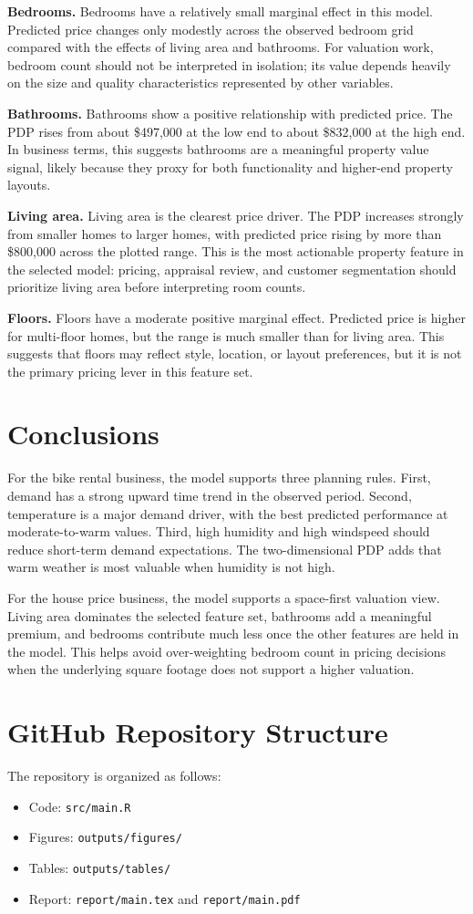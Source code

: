 \documentclass[11pt]{article}
\begin{document}
\textbf{Bedrooms.}
Bedrooms have a relatively small marginal effect in this model. Predicted price changes only modestly across the observed bedroom grid compared with the effects of living area and bathrooms. For valuation work, bedroom count should not be interpreted in isolation; its value depends heavily on the size and quality characteristics represented by other variables.

\textbf{Bathrooms.}
Bathrooms show a positive relationship with predicted price. The PDP rises from about \$497,000 at the low end to about \$832,000 at the high end. In business terms, this suggests bathrooms are a meaningful property value signal, likely because they proxy for both functionality and higher-end property layouts.

\textbf{Living area.}
Living area is the clearest price driver. The PDP increases strongly from smaller homes to larger homes, with predicted price rising by more than \$800,000 across the plotted range. This is the most actionable property feature in the selected model: pricing, appraisal review, and customer segmentation should prioritize living area before interpreting room counts.

\textbf{Floors.}
Floors have a moderate positive marginal effect. Predicted price is higher for multi-floor homes, but the range is much smaller than for living area. This suggests that floors may reflect style, location, or layout preferences, but it is not the primary pricing lever in this feature set.

\section{Conclusions}

For the bike rental business, the model supports three planning rules. First, demand has a strong upward time trend in the observed period. Second,  temperature is a major demand driver, with the best predicted performance at moderate-to-warm values. Third, high humidity and high windspeed should reduce short-term demand expectations. The two-dimensional PDP adds that warm weather is most valuable when humidity is not high.

For the house price business, the model supports a space-first valuation view. Living area dominates the selected feature set, bathrooms add a meaningful premium, and bedrooms contribute much less once the other features are held in the model. This helps avoid over-weighting bedroom count in pricing decisions when the underlying square footage does not support a higher valuation.

\section{GitHub Repository Structure}

The repository is organized as follows:

\begin{itemize}
\item Code: \texttt{src/main.R}
\item Figures: \texttt{outputs/figures/}
\item Tables: \texttt{outputs/tables/}
\item Report: \texttt{report/main.tex} and \texttt{report/main.pdf}
\end{itemize}
\end{document}
